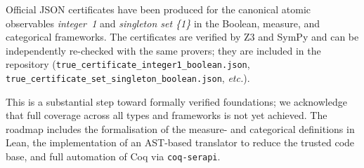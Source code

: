 Official JSON certificates have been produced for the canonical atomic
observables \emph{integer~1} and \emph{singleton set \{1\}} in the
Boolean, measure, and categorical frameworks.  The certificates are
verified by Z3 and SymPy and can be independently re-checked with the
same provers; they are included in the repository
(\texttt{true\_certificate\_integer1\_boolean.json},
\texttt{true\_certificate\_set\_singleton\_boolean.json}, \emph{etc.}).

This is a substantial step toward formally verified foundations; we
acknowledge that full coverage across all types and frameworks is not
yet achieved.  The roadmap includes the formalisation of the measure-
and categorical definitions in Lean, the implementation of an
AST-based translator to reduce the trusted code base, and full
automation of Coq via \texttt{coq-serapi}.